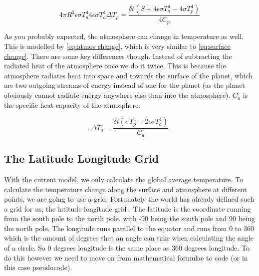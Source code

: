\begin{subequations}
    \begin{equation}
        4\pi R^2 \epsilon \sigma T_a^4
        \label{eq:atmos on surface}
    \end{equation}
    \begin{equation}
        4\epsilon \sigma T_a^4
        \label{eq:atmos on surface improved}
    \end{equation}
    \begin{equation}
        \Delta T_p = \frac{\delta t (S + 4\epsilon \sigma T_a^4 - 4\sigma T_p^4)}{4C_p}
        \label{eq:surface change}
    \end{equation}
    \label{eq:atmos}
\end{subequations}

As you probably expected, the atmosphere can change in temperature as well. This is modelled by \autoref{eq:atmos change}, which is very similar to \autoref{eq:surface change}. There are
some key differences though. Instead of subtracting the radiated heat of the atmosphere once we do it twice. This is because the atmosphere radiates heat into space and towards the 
surface of the planet, which are two outgoing streams of energy instead of one for the planet (as the planet obviously cannot radiate energy anywhere else than into the atmosphere).
$C_a$ is the specific heat capacity of the atmosphere.

\begin{equation}
    \Delta T_a = \frac{\delta t (\sigma T_p^4 - 2\epsilon\sigma T_a^4)}{C_a}
    \label{eq:atmos change}
\end{equation}

\subsection{The Latitude Longitude Grid}
With the current model, we only calculate the global average temperature. To calculate the temperature change along the surface and atmosphere at different points, we are going to use a grid.
Fortunately the world has already defined such a grid for us, the latitude longitude grid \cite{latlong}. The latitude is the coordinate running from the south pole to the north pole, with -90 
being the south pole and 90 being the north pole. The longitude runs parallel to the equator and runs from 0 to 360 which is the amount of degrees that an angle can take when calculating the 
angle of a circle. So 0 degrees longitude is the same place as 360 degrees longitude. To do this however we need to move on from mathematical formulae to code (or in this case pseudocode).

